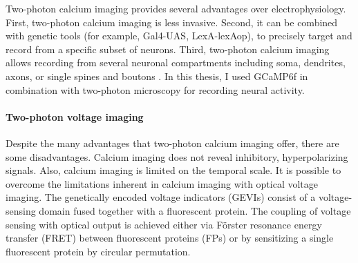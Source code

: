 Two-photon calcium imaging provides several advantages over electrophysiology. First, two-photon calcium imaging is less invasive. Second, it can be combined with genetic tools (for example, Gal4-UAS, LexA-lexAop), to precisely target and record from a specific subset of neurons. Third, two-photon calcium imaging allows recording from several neuronal compartments including soma, dendrites, axons, or single spines and boutons \parencite{Grienberger2022}. In this thesis, I used GCaMP6f  \parencite{Chen2013} in combination with two-photon microscopy for recording neural activity.

\paragraph{Two-photon voltage imaging}
Despite the many advantages that two-photon calcium imaging offer, there are some disadvantages. Calcium imaging does not reveal inhibitory, hyperpolarizing signals. Also, calcium imaging is limited on the temporal scale. It is possible to overcome the limitations inherent in calcium imaging with optical voltage imaging. The genetically encoded voltage indicators (GEVIs) consist of a voltage-sensing domain fused together with a fluorescent protein. The coupling of voltage sensing with optical output is achieved either via Förster resonance energy transfer (FRET) between fluorescent proteins (FPs) or by sensitizing a single fluorescent protein by circular permutation. 

